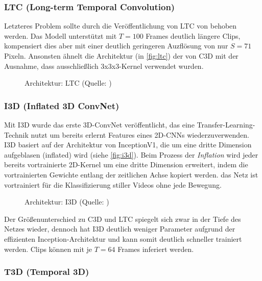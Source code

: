 \subsubsection*{LTC (Long-term Temporal Convolution)}

Letzteres Problem sollte durch die Veröffentlichung von LTC von \cite{Varol18} behoben werden.
Das Modell unterstützt mit $T=100$ Frames deutlich längere Clips, kompensiert dies aber mit einer deutlich geringeren Auzflösung von nur $S=71$ Pixeln.
Ansonsten ähnelt die Architektur (in \autoref{fig:ltc}) der von C3D mit der Ausnahme, dass ausschließlich 3x3x3-Kernel verwendet wurden.

\begin{figure}[h!]
    \centering
    \caption{Architektur: LTC (Quelle: \cite{Varol18})}
    \label{fig:ltc}
\end{figure}

\subsubsection*{I3D (Inflated 3D ConvNet)}

Mit I3D \cite{Carreira17} wurde das erste 3D-ConvNet veröffentlicht, das eine Transfer-Learning-Technik nutzt um bereits erlernt Features eines 2D-CNNs wiederzuverwenden.
I3D basiert auf der Architektur von InceptionV1, die um eine dritte Dimension aufgeblasen (inflated) wird (siehe \autoref{fig:i3d}).
Beim Prozess der \emph{Inflation} wird jeder bereits vortrainierte 2D-Kernel um eine dritte Dimension erweitert, indem die vortrainierten Gewichte entlang der zeitlichen Achse kopiert werden.
\Dh das Netz ist vortrainiert für die Klassifizierung stiller Videos ohne jede Bewegung.

\begin{figure}[h!]
    \centering
    \caption{Architektur: I3D (Quelle: \cite{Carreira17})}
    \label{fig:i3d}
\end{figure}

Der Größenunterschied zu C3D und LTC spiegelt sich zwar in der Tiefe des Netzes wieder, dennoch hat I3D deutlich weniger Parameter aufgrund der effizienten Inception-Architektur und kann somit deutlich schneller trainiert werden.
Clips können mit je $T=64$ Frames inferiert werden.

\subsubsection*{T3D (Temporal 3D)}

